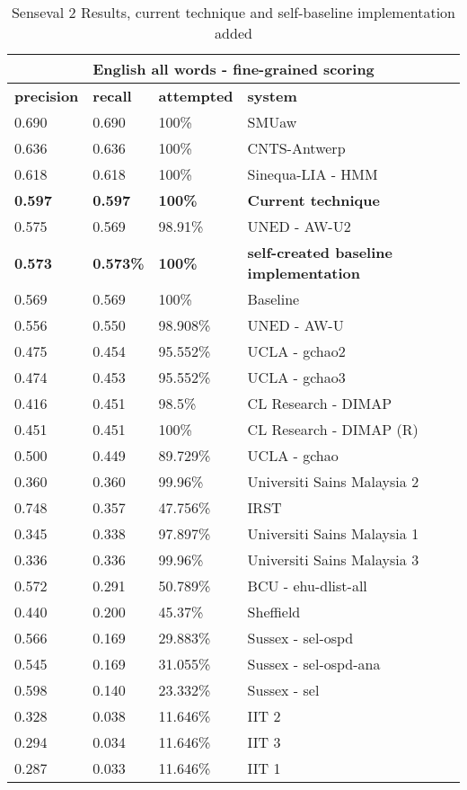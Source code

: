 \begin{table}[htp]
	\begin{tabular}{|l|l|l|l|}
		\hline
		  \multicolumn{4}{|c|}{\bf English all words - fine-grained scoring } \\
		\hline
		{\bf precision } & {\bf recall} & {\bf attempted} & {\bf system} \\ \hline 
		0.690	&	0.690	&	100\%	&		SMUaw \\ \hline
		0.636	&	0.636	&	100\%	&		CNTS-Antwerp \\ \hline
		0.618	&	0.618	&	100\%	&		Sinequa-LIA - HMM \\ \hline
		
		{\bf 0.597} & {\bf 0.597} & {\bf 100\% } &	{\bf Current technique} \\ \hline	
		
		0.575	&	0.569	&	98.91\% &		UNED - AW-U2 \\ \hline
		
		{\bf 0.573} & {\bf 0.573\% } & {\bf 100\%} &	{\bf self-created baseline implementation } \\ \hline
		
		0.569	&	0.569	&	100\%		&	Baseline \\ \hline
		0.556	&	0.550	&	98.908\%	&	UNED - AW-U	 \\ \hline
		0.475	&	0.454	&	95.552\%	&	UCLA - gchao2 \\ \hline
		0.474	&	0.453	&	95.552\%	&	UCLA - gchao3 \\ \hline
		0.416	&	0.451	&	98.5\%		&	CL Research - DIMAP	 \\ \hline
		0.451	&	0.451	&	100\%		&	CL Research - DIMAP (R)	 \\ \hline
		0.500	&	0.449	&	89.729\%	&	UCLA - gchao \\ \hline
		0.360	&	0.360	&	99.96\%		&	Universiti Sains Malaysia 2	 \\ \hline
		0.748	&	0.357	&	47.756\%	&	IRST \\ \hline
		0.345	&	0.338	&	97.897\%	&	Universiti Sains Malaysia 1 \\ \hline
		0.336	&	0.336	&	99.96\%		&	Universiti Sains Malaysia 3 \\ \hline
		0.572	&	0.291	&	50.789\%	&	BCU - ehu-dlist-all \\ \hline
		0.440	&	0.200	&	45.37\%		&	Sheffield \\ \hline
		0.566	&	0.169	&	29.883\%	&	Sussex - sel-ospd \\ \hline
		0.545	&	0.169	&	31.055\%	&	Sussex - sel-ospd-ana \\ \hline
		0.598	&	0.140	&	23.332\%	&	Sussex - sel \\ \hline
		0.328	&	0.038	&	11.646\%	&	IIT 2 \\ \hline
		0.294	&	0.034	&	11.646\%	&	IIT 3 \\ \hline
		0.287	&	0.033	&	11.646\%	&	IIT 1 \\ \hline
	\end{tabular}
	\caption{Senseval 2 Results, current technique and self-baseline implementation added \label{table:SENSEVAL2RESULTS}}
\end{table}

